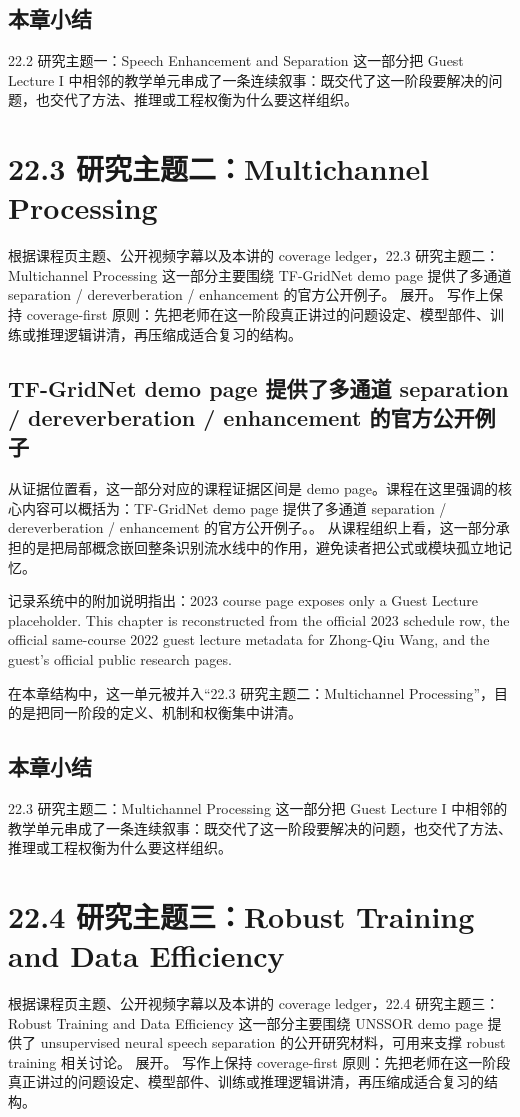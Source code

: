 \documentclass[a4paper]{article}
\begin{document}
\subsection{本章小结}
22.2 研究主题一：Speech Enhancement and Separation 这一部分把 Guest Lecture I 中相邻的教学单元串成了一条连续叙事：既交代了这一阶段要解决的问题，也交代了方法、推理或工程权衡为什么要这样组织。

\section{22.3 研究主题二：Multichannel Processing}
根据课程页主题、公开视频字幕以及本讲的 coverage ledger，22.3 研究主题二：Multichannel Processing 这一部分主要围绕 TF-GridNet demo page 提供了多通道 separation / dereverberation / enhancement 的官方公开例子。 展开。
写作上保持 coverage-first 原则：先把老师在这一阶段真正讲过的问题设定、模型部件、训练或推理逻辑讲清，再压缩成适合复习的结构。

\subsection{TF-GridNet demo page 提供了多通道 separation / dereverberation / enhancement 的官方公开例子}
从证据位置看，这一部分对应的课程证据区间是 demo page。课程在这里强调的核心内容可以概括为：TF-GridNet demo page 提供了多通道 separation / dereverberation / enhancement 的官方公开例子。。
从课程组织上看，这一部分承担的是把局部概念嵌回整条识别流水线中的作用，避免读者把公式或模块孤立地记忆。

记录系统中的附加说明指出：2023 course page exposes only a Guest Lecture placeholder. This chapter is reconstructed from the official 2023 schedule row, the official same-course 2022 guest lecture metadata for Zhong-Qiu Wang, and the guest's official public research pages.

在本章结构中，这一单元被并入“22.3 研究主题二：Multichannel Processing”，目的是把同一阶段的定义、机制和权衡集中讲清。

\subsection{本章小结}
22.3 研究主题二：Multichannel Processing 这一部分把 Guest Lecture I 中相邻的教学单元串成了一条连续叙事：既交代了这一阶段要解决的问题，也交代了方法、推理或工程权衡为什么要这样组织。

\section{22.4 研究主题三：Robust Training and Data Efficiency}
根据课程页主题、公开视频字幕以及本讲的 coverage ledger，22.4 研究主题三：Robust Training and Data Efficiency 这一部分主要围绕 UNSSOR demo page 提供了 unsupervised neural speech separation 的公开研究材料，可用来支撑 robust training 相关讨论。 展开。
写作上保持 coverage-first 原则：先把老师在这一阶段真正讲过的问题设定、模型部件、训练或推理逻辑讲清，再压缩成适合复习的结构。
\end{document}
